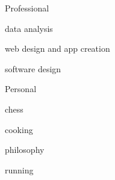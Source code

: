 

\begin{cventries}


  \cventry
    {Professional} %
    {} %
    {} %
    {} %
    {
      \begin{cvitems} %
        \item {data analysis}
        \item {web design and app creation}
        \item {software design}
      \end{cvitems}
    }

  \cventry
    {Personal} %
    {} %
    {} %
    {} %
    {
      \begin{cvitems} %
        \item {chess}
        \item {cooking}
        \item {philosophy}
        \item {running}
      \end{cvitems}
    }

\end{cventries}
